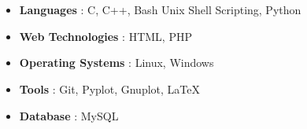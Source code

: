 \\[-0.7cm]\\
\begin{itemize}
  \item \textbf{Languages} : C, C++, Bash Unix Shell Scripting, Python\\[-0.5cm] 
  \item \textbf{Web Technologies} : HTML, PHP\\[-0.5cm]
  \item \textbf{Operating Systems} : Linux, Windows \\[-0.5cm]
  \item \textbf{Tools} : Git, Pyplot, Gnuplot, \LaTeX \\[-0.5cm]
  \item \textbf{Database} : MySQL\\[-0.5cm]
\end{itemize}
